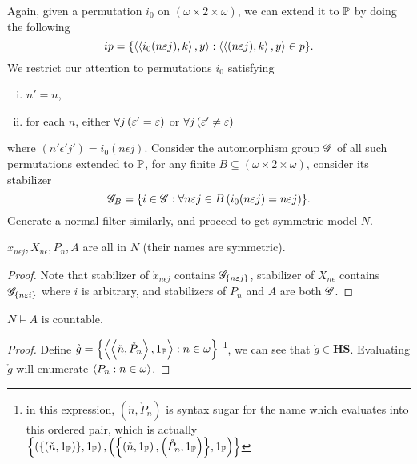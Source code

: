 Again, given a permutation \(i_0\) on \((\omega\times2\times\omega)\), we can extend it to \(\P\) by doing the following
\[i p = \set{ \Angle{\Angle{i_0(n\epsilon j), k}, y}: \Angle{\Angle{(n\epsilon j),k}, y} \in p }.\]
We restrict our attention to permutations \(i_0\) satisfying
\begin{enumerate}[i.]
    \item \(n' = n\),
    \item for each \(n\), either \(\forall j\paren{\epsilon' = \epsilon}\) or \(\forall j\paren{\epsilon' \ne \epsilon}\)
\end{enumerate}
where \((n'\epsilon' j') = i_0(n\epsilon j)\).
Consider the automorphism group \(\G\) of all such permutations extended to \(\P\),
for any finite \(B\subseteq (\omega\times2\times\omega)\), consider its stabilizer
\[ \G_B = \set{ i\in \G: \forall n\epsilon j\in B\left( i_0(n\epsilon j) = n\epsilon j \right) }. \]
Generate a normal filter similarly, and proceed to get symmetric model \(N\).


\begin{proposition}
    \(x_{n\epsilon j}, X_{n\epsilon}, P_n, A\) are all in \(N\) (their names are symmetric).
\end{proposition}
\begin{proof}
    Note that stabilizer of \(\mathring{x}_{n\epsilon j}\) contains \(\G_{\set{n\epsilon j}}\),
    stabilizer of \(X_{n\epsilon}\) contains \(\G_{\set{n\epsilon i}}\) where \(i\) is arbitrary,
    and stabilizers of \(P_n\) and \(A\) are both \(\G\).
\end{proof}

\begin{lemma}
    \(N\models A\text{ is countable}\).
\end{lemma}
\begin{proof}
  Define \(\mathring{g} = \set{\Angle{\Angle{\check{n}, \mathring{P}_n}, 1_\P}: n\in\omega}\)
  \footnote{in this expression, \((\check{n}, \mathring{P}_n)\) is syntax sugar for the name which evaluates into this ordered pair,
  which is actually \(\set{\paren{\set{\paren{\check{n},1_\P}},1_\P},\paren{\set{\paren{\check{n},1_\P},\paren{\mathring{P}_n,1_\P}},1_\P}}\)},
  we can see that \(\mathring{g}\in \mathbf{HS}\).
  Evaluating \(\mathring{g}\) will enumerate \(\Angle{ P_n: n\in\omega }\).
\end{proof}


